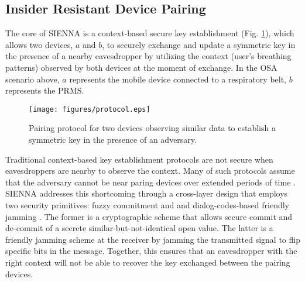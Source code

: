 \subsection{Insider Resistant Device Pairing}
\label{section:key evolution}
The core of SIENNA is a context-based secure key establishment (Fig. \ref{fig:key evolution_diag}), which allows two devices, $a$ and $b$, to securely exchange and update a symmetric key in the presence of a nearby eavesdropper by utilizing the context (user's breathing patterns) observed by both devices at the moment of exchange. In the OSA scenario above, $a$ represents the mobile device connected to a respiratory belt, $b$ represents the PRMS.

\begin{figure}[h]
\centering
\texttt{[image: figures/protocol.eps]}
\caption{Pairing protocol for two devices observing similar data to establish a symmetric key in the presence of an adversary.}
\label{fig:key evolution_diag}
\vspace{-10pt}
\end{figure}



Traditional context-based key establishment protocols are not secure when eavesdroppers are nearby to observe the context. Many of such protocols assume that the adversary cannot be near paring devices over extended periods of time \cite{MiettinenContextBasedZeroInteractionPairing2014}. SIENNA addresses this shortcoming through a cross-layer design that employs two security primitives: fuzzy commitment \cite{JuelsFuzzyCommitmentScheme1999} and and dialog-codes-based friendly jamming \cite{AroraDialogCodesSecure2009,GollakotaPhysicalLayerWireless2011, MelcherIJamChannelRandomization2020}. The former is a cryptographic scheme that allows secure commit and de-commit of a secrete similar-but-not-identical open value. The latter is a friendly jamming scheme at the receiver by jamming the transmitted signal to flip specific bits in the message. Together, this ensures that an eavesdropper with the right context will not be able to recover the key exchanged between the pairing devices.


